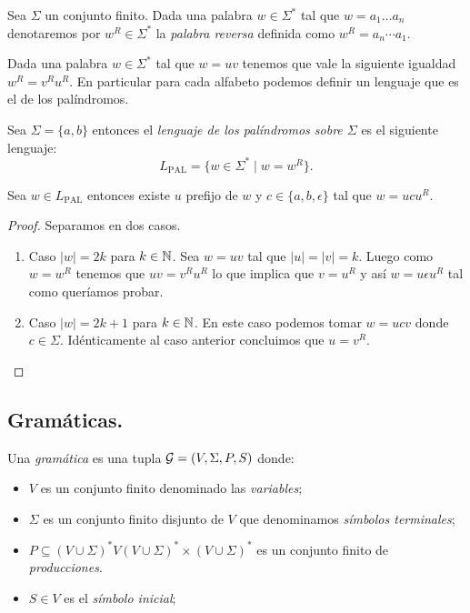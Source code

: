 \documentclass[tesis.tex]{subfiles}
\begin{document}
\begin{deff}\label{deff_pal_reversa}
	Sea $\Sigma$ un conjunto finito.
	Dada una palabra $w \in \Sigma^*$ tal que $w = a_1 \dots a_n$ denotaremos por $w^R \in \Sigma^*$ la \emph{palabra reversa} definida como $w^R = a_{n} \cdots a_{1}$.
\end{deff}

Dada una palabra $w \in \Sigma^*$ tal que $w = uv$ tenemos que vale la siguiente igualdad $w^R = v^Ru^R$.
En particular para cada alfabeto podemos definir un lenguaje que es el de los palíndromos.

\begin{deff}
	Sea $\Sigma = \{a,b\}$ entonces el \emph{lenguaje de los palíndromos sobre $\Sigma$} es el siguiente lenguaje:
	\[
		L_{\text{PAL}} = \{  w \in \Sigma^* \mid w = w^R \}.
	\]
\end{deff}



\begin{lema}\label{lema_palindromos_forma}
	Sea $w \in L_{\text{PAL}}$ entonces existe $u$ prefijo de $w$ y $c \in \{ a, b, \epsilon\}$ tal que $w = ucu^R$.
\end{lema}
\begin{proof}
	Separamos en dos casos.
	\begin{enumerate}
		\item Caso $|w| = 2k$ para $k \in \mathbb{N}$.
		Sea $w = uv$ tal que $|u| = |v| = k$. 
		Luego como $w = w^R$ tenemos que $uv = v^Ru^R$ lo que implica que $v = u^R$ y así $w = u \epsilon u^R$ tal como queríamos probar.
		
		\item Caso $|w| = 2k+1$ para $k \in \mathbb{N}$.
		En este caso podemos tomar $w = ucv$ donde $c \in \Sigma$.
		Idénticamente al caso anterior concluimos que $u = v^R$.
	\end{enumerate}
\end{proof}


\subsection{Gramáticas.}

\begin{deff}
	Una \emph{gramática} es una tupla ${\cal G} = (V, \Sigma, P, S)$ donde:
	\begin{itemize}
		\item $V$ es un conjunto finito denominado las \emph{variables};
		\item $\Sigma$ es un conjunto finito disjunto de $V$ que denominamos \emph{símbolos terminales};
		\item $P \subseteq (V \cup \Sigma)^*V(V \cup \Sigma)^* \times (V \cup \Sigma)^*$ es un conjunto finito de \emph{producciones}.
		\item $S \in V$ es el \emph{símbolo inicial};
	\end{itemize}
\end{deff}
\end{document}
